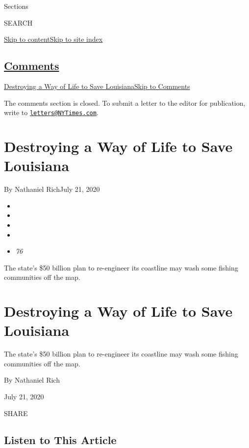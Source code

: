 Sections

SEARCH

\protect\hyperlink{site-content}{Skip to
content}\protect\hyperlink{site-index}{Skip to site index}

\hypertarget{comments}{%
\subsection{\texorpdfstring{\protect\hyperlink{commentsContainer}{Comments}}{Comments}}\label{comments}}

\href{}{Destroying a Way of Life to Save Louisiana}\href{}{Skip to
Comments}

The comments section is closed. To submit a letter to the editor for
publication, write to
\href{mailto:letters@NYTimes.com}{\nolinkurl{letters@NYTimes.com}}.

\hypertarget{destroying-a-way-of-life-to-save-louisiana}{%
\section{Destroying a Way of Life to Save
Louisiana}\label{destroying-a-way-of-life-to-save-louisiana}}

By Nathaniel RichJuly 21, 2020

\begin{itemize}
\item
\item
\item
\item
\item
  \emph{76}
\end{itemize}

The state's \$50 billion plan to re-engineer its coastline may wash some
fishing communities off the map.

\hypertarget{destroying-a-way-of-life-to-save-louisiana-1}{%
\section{Destroying a Way of Life to Save
Louisiana}\label{destroying-a-way-of-life-to-save-louisiana-1}}

The state's \$50 billion plan to re-engineer its coastline may wash some
fishing communities off the map.

By Nathaniel Rich

July 21, 2020

SHARE

\hypertarget{listen-to-this-article}{%
\subsection{Listen to This Article}\label{listen-to-this-article}}

